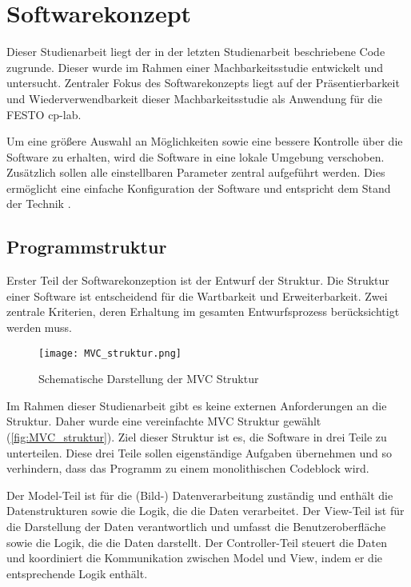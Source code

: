 \chapter{Softwarekonzept} \label{chap:Konzept}

Dieser Studienarbeit liegt der in der letzten Studienarbeit beschriebene Code zugrunde. Dieser wurde im Rahmen einer Machbarkeitsstudie entwickelt und untersucht.
Zentraler Fokus des Softwarekonzepts liegt auf der Präsentierbarkeit und Wiederverwendbarkeit dieser Machbarkeitsstudie als Anwendung für die FESTO \ac{cp-lab}.

Um eine größere Auswahl an Möglichkeiten sowie eine bessere Kontrolle über die Software zu erhalten, wird die Software in eine lokale Umgebung verschoben. Zusätzlich sollen alle einstellbaren Parameter zentral aufgeführt werden. Dies ermöglicht eine einfache Konfiguration der Software und entspricht dem Stand der Technik \cite{gur_diskussion_2024} \cite{oliveira_how_2023}.

\section{Programmstruktur} \label{sec:architektur}

Erster Teil der Softwarekonzeption ist der Entwurf der Struktur. Die Struktur einer Software ist entscheidend für die Wartbarkeit und Erweiterbarkeit. Zwei zentrale Kriterien, deren Erhaltung im gesamten Entwurfsprozess berücksichtigt werden muss.

\begin{figure}[H]
    \centering
    \texttt{[image: MVC\_struktur.png]}
    \caption{Schematische Darstellung der MVC Struktur \cite{noauthor_model_2024}} 
    \label{fig:MVC_struktur}
\end{figure}

Im Rahmen dieser Studienarbeit gibt es keine externen Anforderungen an die Struktur. Daher wurde eine vereinfachte \ac{MVC} Struktur gewählt (\autoref{fig:MVC_struktur}). Ziel dieser Struktur ist es, die Software in drei Teile zu unterteilen.
Diese drei Teile sollen eigenständige Aufgaben übernehmen und so verhindern, dass das Programm zu einem monolithischen Codeblock wird.

Der Model-Teil ist für die (Bild-) Datenverarbeitung zuständig und enthält die Datenstrukturen sowie die Logik, die die Daten verarbeitet. Der View-Teil ist für die Darstellung der Daten verantwortlich und umfasst die Benutzeroberfläche sowie die Logik, die die Daten darstellt. Der Controller-Teil steuert die Daten und koordiniert die Kommunikation zwischen Model und View, indem er die entsprechende Logik enthält.

